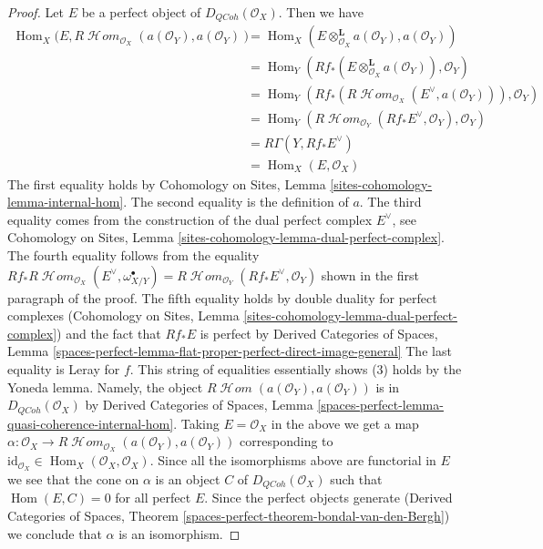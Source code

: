 \documentclass{stacks-project}
\theoremstyle{plain}
\theoremstyle{definition}
\theoremstyle{remark}
\numberwithin{equation}{subsection}
\def\Hom{\mathop{\mathrm{Hom}}\nolimits}
\def\SheafHom{\mathop{\mathcal{H}\!\mathit{om}}\nolimits}
\def\QCoh{\mathit{QCoh}}
\begin{document}
\begin{proof}
\medskip\noindent
Let $E$ be a perfect object of $D_\QCoh(\mathcal{O}_X)$. Then
we have
\begin{align*}
\Hom_X(E, R\SheafHom_{\mathcal{O}_X}(a(\mathcal{O}_Y), a(\mathcal{O}_Y))
& =
\Hom_X(E \otimes_{\mathcal{O}_X}^\mathbf{L} a(\mathcal{O}_Y),
a(\mathcal{O}_Y)) \\
& =
\Hom_Y(Rf_*(E \otimes_{\mathcal{O}_X}^\mathbf{L} a(\mathcal{O}_Y)),
\mathcal{O}_Y) \\
& =
\Hom_Y(Rf_*(R\SheafHom_{\mathcal{O}_X}(E^\vee, a(\mathcal{O}_Y))),
\mathcal{O}_Y) \\
& =
\Hom_Y(R\SheafHom_{\mathcal{O}_Y}(Rf_*E^\vee, \mathcal{O}_Y),
\mathcal{O}_Y) \\
& =
R\Gamma(Y, Rf_*E^\vee) \\
& =
\Hom_X(E, \mathcal{O}_X)
\end{align*}
The first equality holds by Cohomology on Sites, Lemma
\ref{sites-cohomology-lemma-internal-hom}.
The second equality is the definition of $a$.
The third equality comes from the construction of the dual perfect
complex $E^\vee$, see Cohomology on Sites, Lemma
\ref{sites-cohomology-lemma-dual-perfect-complex}.
The fourth equality follows from the equality
$Rf_*R\SheafHom_{\mathcal{O}_X}(E^\vee, \omega_{X/Y}^\bullet) =
R\SheafHom_{\mathcal{O}_Y}(Rf_*E^\vee, \mathcal{O}_Y)$
shown in the first paragraph of the proof.
The fifth equality holds by double duality for perfect complexes
(Cohomology on Sites, Lemma
\ref{sites-cohomology-lemma-dual-perfect-complex})
and the fact that $Rf_*E$ is perfect by
Derived Categories of Spaces, Lemma
\ref{spaces-perfect-lemma-flat-proper-perfect-direct-image-general}
The last equality is Leray for $f$.
This string of equalities essentially shows (3)
holds by the Yoneda lemma. Namely, the object
$R\SheafHom(a(\mathcal{O}_Y), a(\mathcal{O}_Y))$
is in $D_\QCoh(\mathcal{O}_X)$ by Derived Categories of Spaces, Lemma
\ref{spaces-perfect-lemma-quasi-coherence-internal-hom}.
Taking $E = \mathcal{O}_X$ in the above we get a map
$\alpha : \mathcal{O}_X \to
R\SheafHom_{\mathcal{O}_X}(a(\mathcal{O}_Y), a(\mathcal{O}_Y))$
corresponding to
$\text{id}_{\mathcal{O}_X} \in \Hom_X(\mathcal{O}_X, \mathcal{O}_X)$.
Since all the isomorphisms above are functorial in $E$ we
see that the cone on $\alpha$ is an object $C$ of $D_\QCoh(\mathcal{O}_X)$
such that $\Hom(E, C) = 0$ for all perfect $E$.
Since the perfect objects generate
(Derived Categories of Spaces, Theorem
\ref{spaces-perfect-theorem-bondal-van-den-Bergh})
we conclude that $\alpha$ is an isomorphism.
\end{proof}
\end{document}
